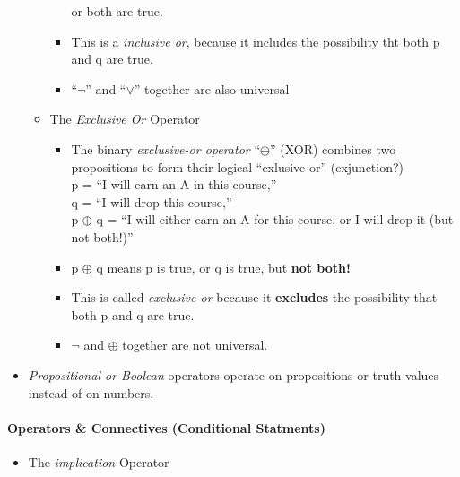 \documentclass[english, 11pt]{article}
\begin{document}
\begin{addmargin}[2em]{2em}
\begin{addmargin}[1em]{2em}
\begin{itemize}
\begin{itemize}
\begin{itemize}
                        or both are true.
                        \item This is a \textit{inclusive or}, because it includes
                        the possibility tht both p and q are true.
                        \item ``$\neg$'' and ``$\vee$'' together are also universal
                      \end{itemize}
                  \item The \textit{Exclusive Or} Operator
                    \begin{itemize}
                      \item The binary \textit{exclusive-or operator} ``$\oplus$'' (XOR)
                      combines two propositions to form their logical ``exlusive or'' (exjunction?)
                      \\
                      p = ``I will earn an A in this course,''
                      \\
                      q = ``I will drop this course,''
                      \\
                      p $\oplus$ q = ``I will either earn an A for this course,
                      or I will drop it (but not both!)''

                      \item p $\oplus$ q means p is true, or q is true, but \textbf{not both!}
                      \item This is called \textit{exclusive or} because it
                      \textbf{excludes} the possibility that both p and q are true.
                      \item $\neg$ and $\oplus$ together are not universal.

                \end{itemize}
              \end{itemize}
            \item \textit{Propositional or Boolean} operators operate on
            propositions or truth values instead of on numbers.
          \end{itemize}
    \end{addmargin}

  \paragraph{Operators \& Connectives (Conditional Statments)}
    \begin{itemize}
      \item The \textit{implication} Operator


\end{itemize}
\end{addmargin}
\end{document}
